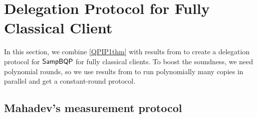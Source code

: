 \section{Delegation Protocol for Fully Classical Client}



In this section, we combine \cref{QPIP1thm} with results from \cite{FOCS:Mahadev18a} to create a delegation protocol for $\operatorname{\mathsf{SampBQP}}$ for fully classical clients. To boost the soundness, we need  polynomial  rounds, so we use results from \cite{parallelrep} to run polynomially many copies in parallel and get a constant-round protocol.






\subsection{Mahadev's measurement protocol}



